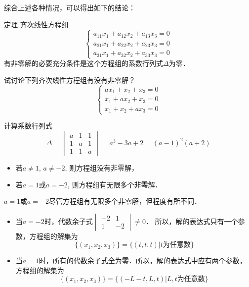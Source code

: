 综合上述各种情况，可以得出如下的结论： 



\begin{blk}{定理}
齐次线性方程组
\[\begin{cases}
    a_{11}x_1+a_{12}x_2+a_{13}x_3=0\\
a_{21}x_1+a_{22}x_2+a_{23}x_3=0\\
a_{31}x_1+a_{32}x_2+a_{33}x_3=0
\end{cases}\]
有非零解的必要充分条件是这个方程组的系数行列式$\Delta$为零．
\end{blk}

\begin{example}
试讨论下列齐次线性方程组有没有非零解？
\[\begin{cases}
    ax_1+x_2+x_3=0\\
    x_1+ax_2+x_3=0\\
    x_1+x_2+ax_3=0
\end{cases}
    \]
\end{example}

\begin{solution}
    计算系数行列式
\[\Delta=\begin{vmatrix}
    a&1&1\\1&a&1\\1&1&a
\end{vmatrix}=a^3-3a+2=(a-1)^2 (a+2)\]

\begin{itemize}
    \item 若$a\ne 1$, $a\ne-2$, 则方程组没有非零解，
    \item 若$a=1$或$a=-2$, 则方程组有无限多个非零解．
\end{itemize}
\end{solution}

\begin{rmk}
    $a=1$或$a=-2$尽管方程组有无限多个非零解，但程度有所不同．
\begin{itemize}
    \item 当$a=-2$时，代数余子式$\begin{vmatrix}
        -2&1\\1&-2
    \end{vmatrix}\ne 0$．
    所以，解的表达式只有一个参数，方程组的解集为$$\{(x_1,x_2,x_3)\}=\{(t,t,t)|\text{$t$为任意数}\}$$
    
    \item  当$a=1$时，所有的代数余子式全为零．所以，解的表达式中应有两个参数，方程组的解集为
    $$\{(x_1,x_2,x_3)\}=\{(-L-t,L,t)|\text{$L,t$为任意数}\}$$
\end{itemize}
\end{rmk}

